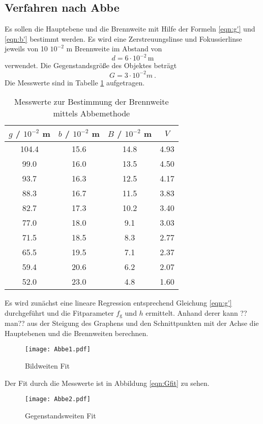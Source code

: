 \subsection{Verfahren nach Abbe}
Es sollen die Hauptebene und die Brennweite mit Hilfe der Formeln \eqref{eqn:g'} und \eqref{eqn:b'} bestimmt werden. Es wird eine Zerstreuungslinse und Fokussierlinse jeweils von 10 $10^{-2}$ m Brennweite im Abstand von
\begin{equation}
  d = 6 \cdot 10^{-2} \, \text{m}
  \label{eqn:d}
\end{equation}
verwendet. Die Gegenstandsgröße des Objektes beträgt
\begin{equation}
  G = 3 \cdot 10^{-2} m \ .
  \label{eqn:G}
\end{equation}
Die Messwerte sind in Tabelle \ref{tab:mabbe} aufgetragen.
\begin{table}
  \centering
  \begin{tabular}{c c c c}
    \toprule
    	$g$ / $10^{-2}$ m & $b$ / $10^{-2}$ m & $B$ / $10^{-2}$ m & $V$ \\
    \midrule
	104.4	& 15.6	& 14.8	& 4.93	\\
	99.0	& 16.0	& 13.5	& 4.50	\\
	93.7	& 16.3	& 12.5	& 4.17	\\
	88.3	& 16.7	& 11.5	& 3.83	\\
	82.7	& 17.3	& 10.2	& 3.40	\\
	77.0	& 18.0	& 9.1	& 3.03	\\
	71.5	& 18.5	& 8.3	& 2.77	\\
	65.5	& 19.5	& 7.1	& 2.37	\\
	59.4	& 20.6	& 6.2	& 2.07	\\
	52.0	& 23.0	& 4.8	& 1.60	\\
    \bottomrule
  \end{tabular}
  \caption{Messwerte zur Bestimmung der Brennweite mittels Abbemethode}
  \label{tab:mabbe}
\end{table}
Es wird zunächst eine lineare Regression entsprechend Gleichung \eqref{eqn:g'} durchgeführt und die Fitparameter $f_\text{g}$ und $h$ ermittelt. Anhand derer kann ??man?? aus der Steigung des Graphens und den Schnittpunkten mit der Achse die Hauptebenen und die Brennweiten berechnen.
\begin{figure}
  \centering
    \texttt{[image: Abbe1.pdf]}
  \caption{Bildweiten Fit}
  \label{fig:Gfit}
\end{figure}
Der Fit durch die Messwerte ist in Abbildung \ref{eqn:Gfit} zu sehen.
\begin{figure}
  \centering
  \texttt{[image: Abbe2.pdf]}
  \caption{Gegenstandsweiten Fit}
  \label{fig:Bfit}
\end{figure}

